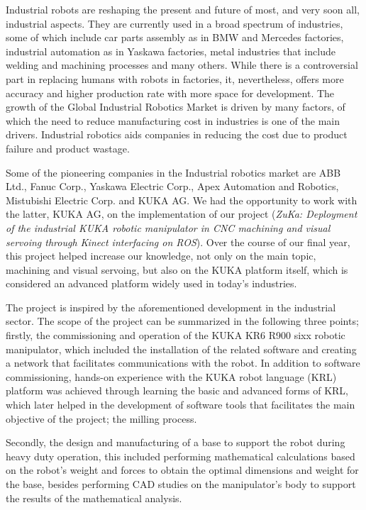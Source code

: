 
	Industrial robots are reshaping the present and future of most, and very soon all, industrial aspects. They are currently used in a broad spectrum of industries, some of which include car parts assembly as in BMW and Mercedes factories, industrial automation as in Yaskawa factories, metal industries that include welding and machining processes and many others. While there is a controversial part in replacing humans with robots in factories, it, nevertheless, offers more accuracy and higher production rate with more space for development. The growth of the Global Industrial Robotics Market is driven by many factors, of which the need to reduce manufacturing cost in industries is one of the main drivers. Industrial robotics aids companies in reducing the cost due to product failure and product wastage.
    
Some of the pioneering companies in the Industrial robotics market are ABB Ltd., Fanuc Corp., Yaskawa Electric Corp., Apex Automation and Robotics, Mistubishi Electric Corp. and KUKA AG. We had the opportunity to work with the latter, KUKA AG, on the implementation of our project (\emph{ZuKa: Deployment of the industrial KUKA robotic manipulator in CNC machining and visual servoing through Kinect interfacing on ROS}). Over the course of our final year, this project helped increase our knowledge, not only on the main topic, machining and visual servoing, but also on the KUKA platform itself, which is considered an advanced platform widely used in today’s industries. 

The project is inspired by the aforementioned development in the industrial sector. The scope of the project can be summarized in the following three points; firstly, the commissioning and operation of the KUKA KR6 R900 sixx robotic manipulator, which included the installation of the related software and creating a network that facilitates communications with the robot. In addition to software commissioning, hands-on experience with the KUKA robot language (KRL) platform was achieved through learning the basic and advanced forms of KRL, which later helped in the development of software tools that facilitates the main objective of the project; the milling process. 

Secondly, the design and manufacturing of a base to support the robot during heavy duty operation, this included performing mathematical calculations based on the robot’s weight and forces to obtain the optimal dimensions and weight for the base, besides performing CAD studies on the manipulator’s body to support the results of the mathematical analysis. 

